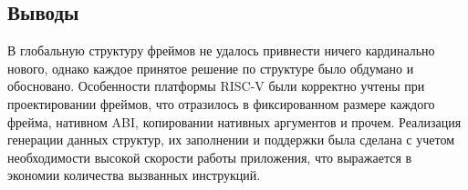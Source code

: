 
\subsection{Выводы}

В глобальную структуру фреймов не удалось привнести ничего кардинально нового, однако каждое принятое решение по структуре было обдумано и обосновано. Особенности платформы RISC-V были корректно учтены при проектировании фреймов, что отразилось в фиксированном размере каждого фрейма, нативном ABI, копировании нативных аргументов и прочем. Реализация генерации данных структур, их заполнении и поддержки была сделана с учетом необходимости высокой скорости работы приложения, что выражается в экономии количества вызванных инструкций.
